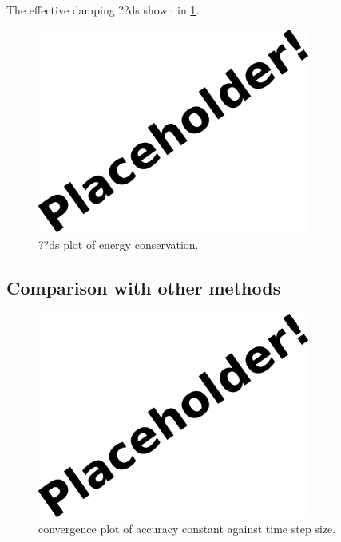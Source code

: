 The effective damping ??ds shown in \cref{fig:aimr-llg-ode-energy}.

\begin{figure}
  \centering
  \includegraphics[width=0.8\textwidth]{images/placeholder}
  \caption{??ds plot of energy conservation.}
  \label{fig:aimr-llg-ode-energy}
\end{figure}


\subsection{Comparison with other methods}


\begin{figure}
  \centering
  \includegraphics[width=0.8\textwidth]{images/placeholder}
  \caption{convergence plot of accuracy constant against time step size.}
  \label{fig:imr-llg-ode-accury-step}
\end{figure}

